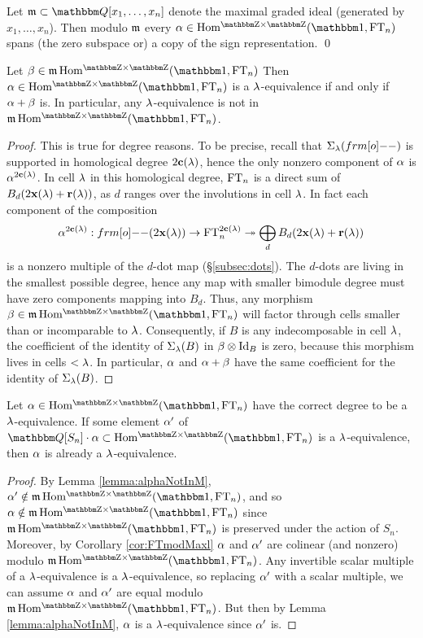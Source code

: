 \begin{cor}\label{cor:FTmodMaxl}
Let $\mg\subset \Q[x_1,\ldots,x_n]$ denote the maximal graded ideal (generated by $x_1,\ldots,x_n$).   Then modulo ${\mathfrak m}$ every $\a\in \Homgg(\one,\FT_n)$ spans (the zero subspace or) a copy of the sign representation. \qed
\end{cor}

\begin{lemma}\label{lemma:alphaNotInM}
Let $\b \in \mg \Homgg(\one,\FT_n)$ Then $\a\in \Homgg(\one,\FT_n)$ is a $\lambda$-equivalence if and only if $\alpha + \beta$ is. In particular, any $\lambda$-equivalence is not in $\mg \Homgg(\one,\FT_n)$.  
\end{lemma}

\begin{proof}
This is true for degree reasons.   To be precise, recall that $\Sigma_\l(\one)$ is supported in homological degree $2\mathbf{c}(\lambda)$, hence the only nonzero component of $\alpha$ is $\alpha^{2\mathbf{c}(\lambda)}$.  In cell $\lambda$ in this homological degree, $\operatorname{FT}_n$ is a direct sum of $B_d(2\mathbf{x}(\lambda)+\mathbf{r}(\lambda))$, as $d$ ranges over the involutions in cell $\lambda$.  In fact each component of the composition
\[
\a^{2\cbb(\l)}: \one(2\xbb(\l)) \rightarrow \FT_n^{2\cbb(\l)}\twoheadrightarrow \bigoplus_d B_d(2\xbb(\l)+\rbb(\l))
\]
is a nonzero multiple of the $d$-dot map (\S \ref{subsec:dots}).  The $d$-dots are living in the smallest possible degree, hence any map with smaller bimodule degree must have zero components mapping into $B_d$.  Thus, any morphism $\b \in \mg \Homgg(\one,\FT_n)$ will factor through cells smaller than or incomparable to $\lambda$. Consequently, if $B$ is any indecomposable in cell $\lambda$, the coefficient of the identity of $\Sigma_\lambda(B)$ in $\beta \otimes \operatorname{Id}_B$ is zero, because this morphism lives in cells $< \lambda$. In particular, $\alpha$ and $\alpha + \beta$ have the same coefficient for the identity of $\Sigma_\lambda(B)$.
\end{proof}

\begin{lemma}\label{lemma:primesnotnecessary}
Let $\a\in \Homgg(\one,\FT_n)$ have the correct degree to be a $\lambda$-equivalence.  If some element $\alpha'$ of $\Q[S_n]\cdot \a\subset \Homgg(\one,\FT_n)$ is a $\lambda$-equivalence, then $\alpha$ is already a $\lambda$-equivalence.
\end{lemma}

\begin{proof} By Lemma \ref{lemma:alphaNotInM}, $\a' \notin \mg\Homgg(\one,\FT_n)$, and so $\a\notin \mg\Homgg(\one,\FT_n)$ since $\mg\Homgg(\one,\FT_n)$ is preserved under the action of
$S_n$. Moreover, by Corollary \ref{cor:FTmodMaxl} $\alpha$ and $\alpha'$ are colinear (and nonzero) modulo $\mg\Homgg(\one,\FT_n)$. Any invertible scalar multiple of a $\lambda$-equivalence is a
$\lambda$-equivalence, so replacing $\alpha'$ with a scalar multiple, we can assume $\alpha$ and $\alpha'$ are equal modulo $\mg\Homgg(\one,\FT_n)$. But then by Lemma \ref{lemma:alphaNotInM}, $\alpha$ is a
$\lambda$-equivalence since $\alpha'$ is. \end{proof}

